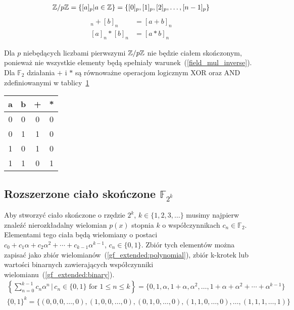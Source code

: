 \begin{align}
    \mathbb{Z} / p \mathbb{Z} = \{ [a]_p | a \in \mathbb{Z} \} = \{ [0]_p, [1]_p,
    [2]_p, \ldots, [n-1]_p \} \label{modulo_elements}
\end{align}
\begin{align}
    [a]_n + [b]_n &= [a + b]_n \label{modulo_addition} \\
    [a]_n * [b]_n &= [a * b]_n \label{modulo_multiplication}
\end{align}

Dla $p$ niebędących liczbami pierwszymi $\mathbb{Z} / p \mathbb{Z}$ nie będzie
ciałem skończonym, ponieważ nie wszystkie elementy będą spełniały
warunek~(\ref{field_mul_inverse}).
Dla $\mathbb{F}_2$ działania $+$ i $*$ są równoważne operacjom logicznym XOR
oraz AND zdefiniowanymi w tablicy~\ref{truth_table:title}
\begin{table}
    \label{truth_table:title}
    \centering
    \begin{tabular}{c c | c c}
        \toprule
        a & b & + & * \\
        \midrule
        0 & 0 & 0 & 0 \\
        \midrule
        0 & 1 & 1 & 0 \\
        \midrule
        1 & 0 & 1 & 0 \\
        \midrule
        1 & 1 & 0 & 1 \\
        \bottomrule
    \end{tabular}
\end{table}

\subsection{Rozszerzone ciało skończone $\mathbb{F}_{2^k}$}

Aby stworzyć ciało skończone o rzędzie $2^k$, $k \in \{ 1, 2, 3, \ldots \}$ musimy
najpierw znaleźć nierozkładalny wielomian $p(x)$ stopnia $k$ o współczynnikach
$c_{n} \in \mathbb{F}_{2}$.
Elementami tego ciała będą wielomiany o postaci $c_{0} + c_{1}\alpha + c_{2}\alpha^{2} +
    \cdots + c_{k-1}\alpha^{k-1}$, $c_{n} \in \{0, 1\}$.
Zbiór tych elementów można zapisać jako zbiór wielomianów~(\ref{gf_extended:polynomial}),
zbiór k-krotek lub wartości binarnych zawierających współczynniki
wielomianu~(\ref{gf_extended:binary}).
\begin{align}
    \left\{ \sum_{n=0}^{k-1} c_{n}\alpha^{n} \,|\, c_{n} \in \{0,1\} \text{ for } 1 \le n \le k \right\}
        = \{ 0, 1, \alpha, 1 + \alpha, \alpha^{2}, \ldots, 1 + \alpha + \alpha^2 + \cdots + \alpha^{k-1} \}
        \label{gf_extended:polynomial} \\
    \{ 0, 1 \}^{k} = \{ (0, 0, 0, \ldots, 0), (1, 0, 0, \ldots, 0), (0, 1, 0, \ldots, 0),
    (1, 1, 0, \ldots, 0), \ldots, (1, 1, 1, \ldots, 1) \} \label{gf_extended:binary}
\end{align}

